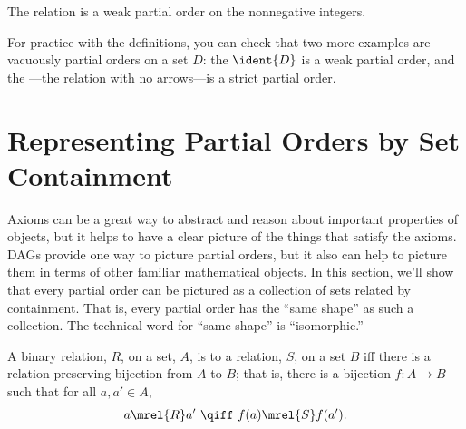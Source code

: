 \iffalse
For integers, $m,n$ we write $m \divides n$ to mean that $m$
\emph{divides} $n$, namely, there is an integer, $k$, such that $n=km$.
\fi

\begin{example}\label{divides}
The  relation is a weak partial order on the nonnegative integers.
\end{example}

For practice with the definitions, you can check that two more
examples are vacuously partial orders on a set $D$: the  $\ident{D}$ is a weak partial order, and the ---the relation with no arrows---is a strict partial order.

\begin{problems}

\classproblems
{}

\end{problems}

\section{Representing Partial Orders by Set Containment}\label{poset-as-sets_sec}

Axioms can be a great way to abstract and reason about important
properties of objects, but it helps to have a clear picture of the
things that satisfy the axioms.  DAGs provide one way to picture
partial orders, but it also can help to picture them in terms of other
familiar mathematical objects.  In this section, we'll show that every
partial order can be pictured as a collection of sets related by
containment.  That is, every partial order has the ``same shape'' as
such a collection.  The technical word for ``same shape'' is
``isomorphic.''

\begin{definition}\label{relation-isomorphism}
  A binary relation, $R$, on a set, $A$, is
   to a relation, $S$, on a set $B$ iff there is a
  relation-preserving bijection from $A$ to $B$; that is, there is
  a bijection $f:A \to B$ such that for all $a,a' \in A$,
  \[
  a \mrel{R} a'\ \qiff\ f(a) \mrel{S} f(a').
  \]
\end{definition}

